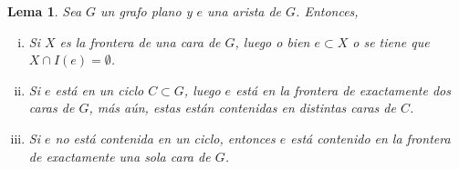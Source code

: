 \documentclass[12pt]{report}
\theoremstyle{plain}
\newtheorem{lemma}[theorem]{Lema}
\theoremstyle{definition}
\begin{document}
\begin{lemma}\label{lema:grafos planos - una arista está en la frontera de una cara o no interseca con el interior de una arista - una arista esta en la frontera de un ciclo luego esta en dos caras de G y en dos caras distintas de C}
Sea $G$ un grafo plano y $e$ una arista de $G$. Entonces,
\begin{enumerate}[(i)]
\item Si $X$ es la frontera de una cara de $G$, luego o bien $e \subset X$ o se tiene que $X \cap I (e) = \emptyset$.
\item Si $e$ está en un ciclo $C \subset G$, luego $e$ está en la frontera de exactamente dos caras de $G$, más aún, estas están contenidas en distintas caras de $C$.
\item Si $e$ no está contenida en un ciclo, entonces $e$ está contenido en la frontera de exactamente una sola cara de $G$.
\end{enumerate}
\end{lemma}
\end{document}
